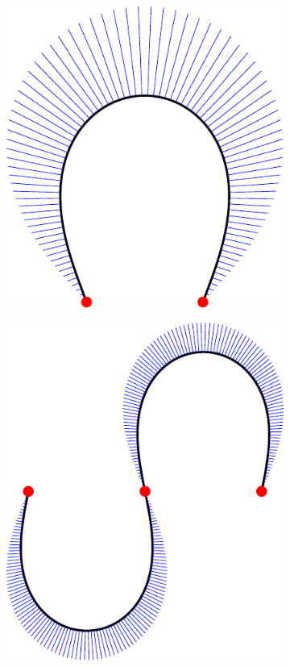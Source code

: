 \documentclass[a4paper]{article}
\begin{document}
				\begin{figure}[htb]
					\centering
					\begin{subfigure}[b]{\textwidth / 3}
						\includegraphics[width=\textwidth]{content/output/fairness_mec_1.pdf}
					\end{subfigure}%
					\begin{subfigure}[b]{\textwidth / 3}
						\includegraphics[width=\textwidth]{content/output/fairness_mec_2.pdf}

\end{subfigure}
\end{figure}
\end{document}
